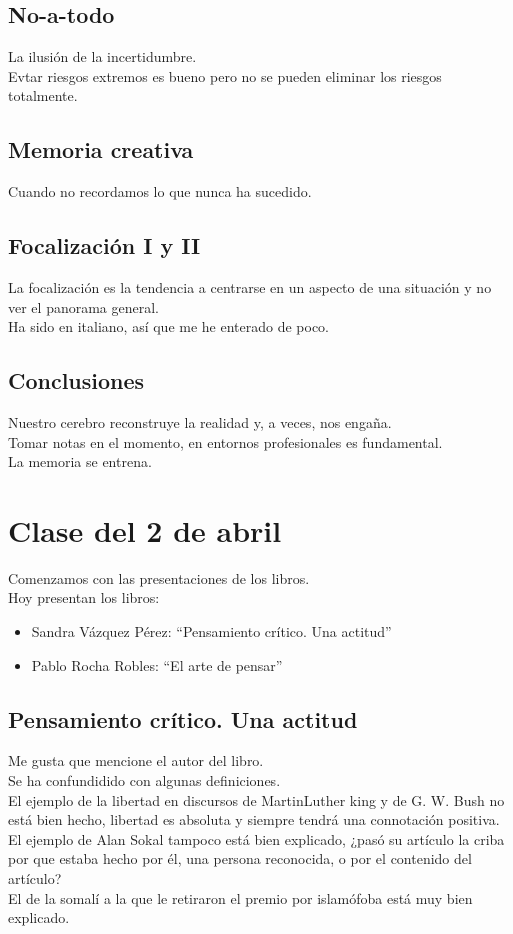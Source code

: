 \documentclass[12pt, a4paper, twoside]{article}
\begin{document}
\subsection{No-a-todo}
La ilusión de la incertidumbre.\\

Evtar riesgos extremos es bueno pero no se pueden eliminar los riesgos totalmente.\\
\subsection{Memoria creativa}
Cuando no recordamos lo que nunca ha sucedido.\\

\subsection{Focalización I y II}
La focalización es la tendencia a centrarse en un aspecto de una situación y no ver el panorama general.\\
Ha sido en italiano, así que me he enterado de poco.\\

\subsection{Conclusiones}
Nuestro cerebro reconstruye la realidad y, a veces, nos engaña.\\
Tomar notas en el momento, en entornos profesionales es fundamental.\\
La memoria se entrena.\\

\section{Clase del 2 de abril}
Comenzamos con las presentaciones de los libros.\\

Hoy presentan los libros:
\begin{itemize}
    \item Sandra Vázquez Pérez: ``Pensamiento crítico. Una actitud''
    \item Pablo Rocha Robles: ``El arte de pensar''
\end{itemize}

\subsection{Pensamiento crítico. Una actitud}
Me gusta que mencione el autor del libro.\\
Se ha confundidido con algunas definiciones.\\
El ejemplo de la libertad en discursos de MartinLuther king y de G. W. Bush 
no está bien hecho, libertad es absoluta y siempre tendrá una connotación positiva.\\
El ejemplo de Alan Sokal tampoco está bien explicado, ¿pasó su artículo la criba por 
que estaba hecho por él, una persona reconocida, o por el contenido del artículo?\\
El de la somalí a la que le retiraron el premio por islamófoba está muy bien explicado.\\
\end{document}
